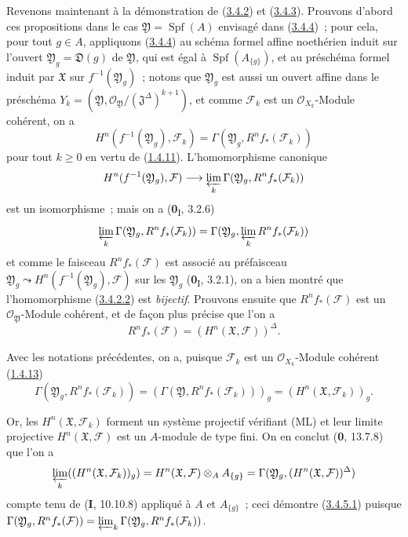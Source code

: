 \begin{env}[3.4.5]
\label{III.3.4.5-fr}
Revenons maintenant à la démonstration de (\hyperref[III.3.4.2-fr]{3.4.2})
et (\hyperref[III.3.4.3-fr]{3.4.3}). Prouvons d'abord ces propositions dans
le cas $\mathfrak Y=\operatorname{Spf}(A)$ envisagé dans
(\hyperref[III.3.4.4-fr]{3.4.4})~; pour cela, pour tout $g\in A$, appliquons
(\hyperref[III.3.4.4-fr]{3.4.4}) au schéma formel affine noethérien induit
sur l'ouvert $\mathfrak Y_g=\mathfrak D(g)$ de $\mathfrak Y$, qui est égal à
$\operatorname{Spf}(A_{\{g\}})$, et au préschéma formel induit par
$\mathfrak X$ sur $f^{-1}(\mathfrak Y_g)$~; notons que $\mathfrak Y_g$ est
aussi un ouvert affine dans le préschéma
$Y_k=(\mathfrak Y,\mathcal O_{\mathfrak Y}/(\mathfrak J^\Delta)^{k+1})$,
et comme $\mathcal F_k$ est un $\mathcal O_{X_k}$-Module cohérent, on a
\[
H^n(f^{-1}(\mathfrak Y_g),\mathcal F_k)
=\Gamma(\mathfrak Y_g,R^nf_*(\mathcal F_k))
\]
pour tout $k\geq0$ en vertu de
(\hyperref[III.1.4.11-fr]{1.4.11}). L'homomorphisme canonique
\[
H^n(f^{-1}(\mathfrak Y_g),\mathcal F)
\longrightarrow\varprojlim_k\Gamma(\mathfrak Y_g,R^nf_*(\mathcal F_k))
\]
est un isomorphisme~; mais on a (\textbf{0}\textsubscript{I}, 3.2.6)
\[
\varprojlim_k\Gamma(\mathfrak Y_g,R^nf_*(\mathcal F_k))
=\Gamma(\mathfrak Y_g,\varprojlim_kR^nf_*(\mathcal F_k))
\]
et comme le faisceau $R^nf_*(\mathcal F)$ est associé au préfaisceau
$\mathfrak Y_g\leadsto H^n(f^{-1}(\mathfrak Y_g),\mathcal F)$ sur les
$\mathfrak Y_g$ (\textbf{0}\textsubscript{I}, 3.2.1), on a bien montré que
l'homomorphisme (\hyperref[III.3.4.2.2-fr]{3.4.2.2}) est \emph{bijectif}. Prouvons
ensuite que $R^nf_*(\mathcal F)$ est un $\mathcal O_{\mathfrak Y}$-Module
cohérent, et de façon plus précise que l'on a
\[
R^nf_*(\mathcal F)=(H^n(\mathfrak X,\mathcal F))^\Delta.
\tag{3.4.5.1}\label{III.3.4.5.1-fr}
\]

Avec les notations précédentes, on a, puisque $\mathcal F_k$ est un
$\mathcal O_{X_k}$-Module cohérent (\hyperref[III.1.4.13-fr]{1.4.13})
\[
\Gamma(\mathfrak Y_g,R^nf_*(\mathcal F_k))
=(\Gamma(\mathfrak Y,R^nf_*(\mathcal F_k)))_g
=(H^n(\mathfrak X,\mathcal F_k))_g.
\]

Or, les $H^n(\mathfrak X,\mathcal F_k)$ forment un système projectif
vérifiant (ML) et leur limite projective $H^n(\mathfrak X,\mathcal F)$ est
un $A$-module de type fini. On en conclut (\textbf{0}, 13.7.8) que l'on a
\[
\varprojlim_k((H^n(\mathfrak X,\mathcal F_k))_g)
=H^n(\mathfrak X,\mathcal F)\otimes_AA_{\{g\}}
=\Gamma(\mathfrak Y_g,(H^n(\mathfrak X,\mathcal F))^\Delta)
\]
compte tenu de (\textbf{I}, 10.10.8) appliqué à $A$ et $A_{\{g\}}$~; ceci démontre
(\hyperref[III.3.4.5.1-fr]{3.4.5.1}) puisque
$\Gamma(\mathfrak Y_g,R^nf_*(\mathcal F))
=\varprojlim_k\Gamma(\mathfrak Y_g,R^nf_*(\mathcal F_k))$.


\end{env}
